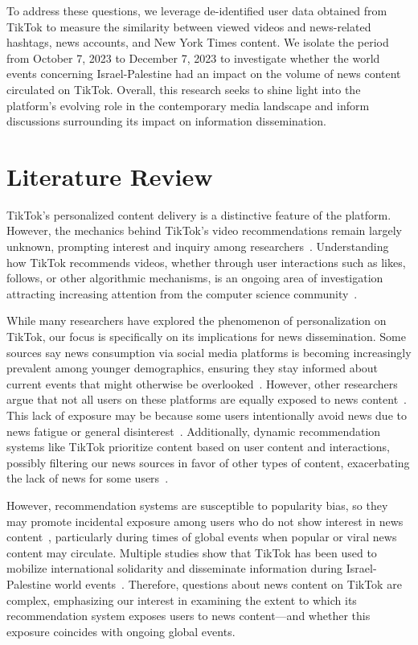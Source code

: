 \documentclass{article}
\begin{document}
{\noindent}To address these questions, we leverage de-identified user data obtained from TikTok to measure the similarity between viewed videos and news-related hashtags, news accounts, and New York Times content. We isolate the period from October 7, 2023 to December 7, 2023 to investigate whether the world events concerning Israel-Palestine had an impact on the volume of news content circulated on TikTok. Overall, this research seeks to shine light into the platform's evolving role in the contemporary media landscape and inform discussions surrounding its impact on information dissemination. 

\section{Literature Review}
TikTok's personalized content delivery is a distinctive feature of the platform. However, the mechanics behind TikTok's video recommendations remain largely unknown, prompting interest and inquiry among researchers~\cite{boeker2022empirical}. Understanding how TikTok recommends videos, whether through user interactions such as likes, follows, or other algorithmic mechanisms, is an ongoing area of investigation attracting increasing attention from the computer science community~\cite{klug2021trick}. \newline 

{\noindent}While many researchers have explored the phenomenon of personalization on TikTok, our focus is specifically on its implications for news dissemination. Some sources say news consumption via social media platforms is becoming increasingly prevalent among younger demographics, ensuring they stay informed about current events that might otherwise be overlooked~\cite{bergstrom2018incidental}. However, other researchers argue that not all users on these platforms are equally exposed to news content~\cite{thorson2020attracting}. This lack of exposure may be because some users intentionally avoid news due to news fatigue or general disinterest~\cite{reiss2023dissecting}. Additionally, dynamic recommendation systems like TikTok prioritize content based on user content and interactions, possibly filtering our news sources in favor of other types of content, exacerbating the lack of news for some users~\cite{damstra2023knowledge}. \newline

{\noindent}However, recommendation systems are susceptible to popularity bias, so they may promote incidental exposure among users who do not show interest in news content~\cite{abdollahpouri2021user}, particularly during times of global events when popular or viral news content may circulate. Multiple studies show that TikTok has been used to mobilize international solidarity and disseminate information during Israel-Palestine world events~\cite{cervi2022freepalestine, yarchi2023image}.  Therefore, questions about news content on TikTok are complex, emphasizing our interest in examining the extent to which its recommendation system exposes users to news content—and whether this exposure coincides with ongoing global events.
\end{document}
